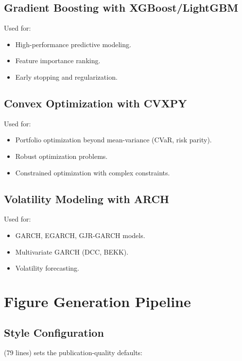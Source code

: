 \subsection{Gradient Boosting with XGBoost/LightGBM}

Used for:
\begin{itemize}
  \item High-performance predictive modeling.
  \item Feature importance ranking.
  \item Early stopping and regularization.
\end{itemize}

\subsection{Convex Optimization with CVXPY}

Used for:
\begin{itemize}
  \item Portfolio optimization beyond mean-variance (CVaR, risk parity).
  \item Robust optimization problems.
  \item Constrained optimization with complex constraints.
\end{itemize}

\subsection{Volatility Modeling with ARCH}

Used for:
\begin{itemize}
  \item GARCH, EGARCH, GJR-GARCH models.
  \item Multivariate GARCH (DCC, BEKK).
  \item Volatility forecasting.
\end{itemize}

\section{Figure Generation Pipeline}
\label{sec:modeling:figures}

\subsection{Style Configuration}

 (79 lines) sets the publication-quality defaults:

